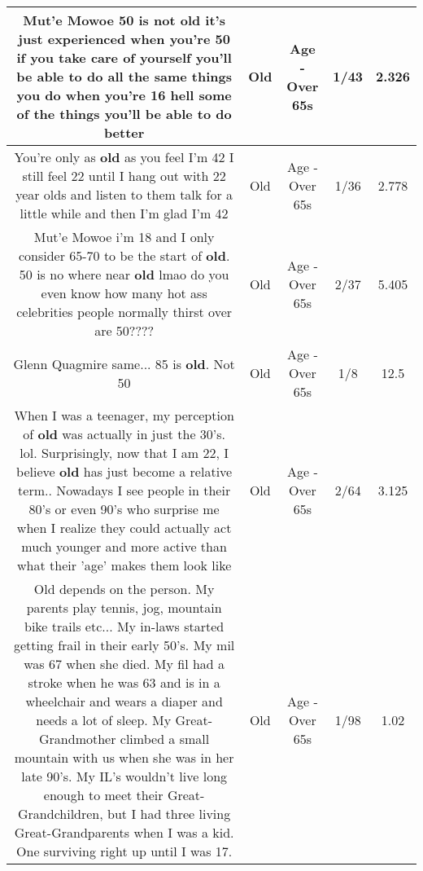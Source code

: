 \documentclass[11pt]{article}
\newlength\mylength
\begin{document}
\begin{center}
\begin{longtable}{|C{.65\mylength}|C{.30\mylength}|C{.12\mylength}|C{.12\mylength}|C{.12\mylength}|}
  \small Mut'e Mowoe 50 is not \textbf{old} it's just experienced when you're 50 if you take care of yourself you'll be able to do all the same things you do when you're 16 hell some of the things you'll be able to do better\normalsize   & Old & Age - Over 65s & 1/43 & 2.326 \\  \hline
  \small You're only as \textbf{old} as you feel I'm 42 I still feel 22 until I hang out with 22 year olds and listen to them talk for a little while and then I'm glad I'm 42\normalsize   & Old & Age - Over 65s & 1/36 & 2.778 \\  \hline
  \small Mut'e Mowoe i'm 18 and I only consider 65-70 to be the start of \textbf{old}. 50 is no where near \textbf{old} lmao do you even know how many hot ass celebrities people normally thirst over are 50????\normalsize   & Old & Age - Over 65s & 2/37 & 5.405 \\  \hline
  \small Glenn Quagmire same... 85 is \textbf{old}. Not 50\normalsize   & Old & Age - Over 65s & 1/8 & 12.5 \\  \hline
  \small When I was a teenager, my perception of \textbf{old} was actually in just the 30's. lol. Surprisingly, now that I am 22, I believe \textbf{old} has just become a relative term.. Nowadays I see people in their 80's or even 90's who surprise me when I realize they could actually act much younger and more active than what their 'age' makes them look like\normalsize   & Old & Age - Over 65s & 2/64 & 3.125 \\  \hline
  \small Old depends on the person. My parents play tennis, jog, mountain bike trails etc... My in-laws started getting frail in their early 50's. My mil was 67 when she died. My fil had a stroke when he was 63 and is in a wheelchair and wears a diaper and needs a lot of sleep. My Great-Grandmother climbed a small mountain with us when she was in her late 90's. My IL's wouldn't live long enough to meet their Great-Grandchildren, but I had three living Great-Grandparents when I was a kid. One surviving right up until I was 17.\normalsize   & Old & Age - Over 65s & 1/98 & 1.02 \\  \hline

\end{longtable}
\end{center}
\end{document}
